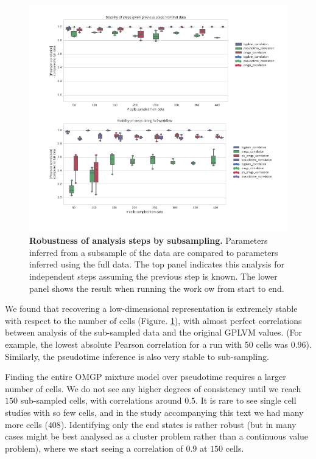 \begin{figure}
    \centering
    \includegraphics[width=\textwidth]{"fig-robustness"}
    \caption[Robustness of analysis steps by subsampling]{\textbf{Robustness of analysis steps by subsampling.} Parameters inferred from a subsample of the data are compared to parameters inferred using the full data. The top panel indicates this analysis for independent steps assuming the previous step is known. The lower panel shows the result when running the work ow from start to end.}
    \label{fig:robustness}
\end{figure}

We found that recovering a low-dimensional representation is extremely stable with respect to the number of cells (Figure. \ref{fig:robustness}), with almost perfect correlations between analysis of the sub-sampled data and the original GPLVM values. (For example, the lowest absolute Pearson correlation for a run with 50 cells was 0.96). Similarly, the pseudotime inference is also very stable to sub-sampling.

Finding the entire OMGP mixture model over pseudotime requires a larger number of cells. We do not see any higher degrees of consistency until we reach $ 150 $ sub-sampled cells, with correlations around $ 0.5 $. It is rare to see single cell studies with so few cells, and in the study accompanying this text we had many more cells ($ 408 $). Identifying only the end states is rather robust (but in many cases might be best analysed as a cluster problem rather than a continuous value problem), where we start seeing a correlation of $ 0.9 $ at $ 150 $ cells.

